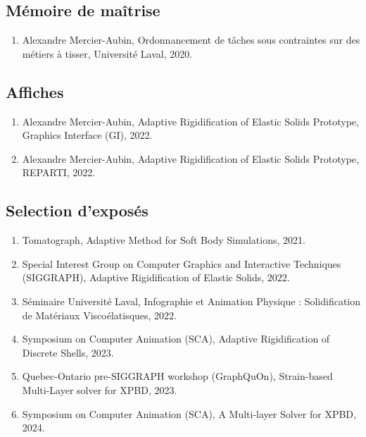 \documentclass[10pt]{article} %
\begin{document}
\subsection{Mémoire de maîtrise}
\begin{enumerate}
  \setcounter{enumi}{\value{listCounter}}
  \item Alexandre Mercier-Aubin, Ordonnancement de tâches sous contraintes sur des métiers à tisser, Université Laval, 2020. 
\end{enumerate}

\subsection{Affiches}
\begin{enumerate}
  \setcounter{enumi}{\value{listCounter}}
  \item Alexandre Mercier-Aubin, Adaptive Rigidification of Elastic Solids Prototype, Graphics Interface (GI), 2022. 
  \item Alexandre Mercier-Aubin, Adaptive Rigidification of Elastic Solids Prototype, REPARTI, 2022. 
\end{enumerate}

\subsection{Selection d'exposés}
\begin{enumerate}
  \setcounter{enumi}{\value{listCounter}}
  \item Tomatograph,  Adaptive Method for Soft Body Simulations, 2021.
  \item Special Interest Group on Computer Graphics and Interactive Techniques (SIGGRAPH), Adaptive Rigidification of Elastic Solids, 2022. 
  \item Séminaire Université Laval, Infographie et Animation Physique : Solidification de Matériaux Viscoélatisques, 2022.
  \item Symposium on Computer Animation (SCA), Adaptive Rigidification of Discrete Shells, 2023. 
  \item Quebec-Ontario pre-SIGGRAPH workshop (GraphQuOn), Strain-based Multi-Layer solver for XPBD, 2023.
  \item Symposium on Computer Animation (SCA), A Multi-layer Solver for XPBD, 2024. 
\end{enumerate}
\end{document}
